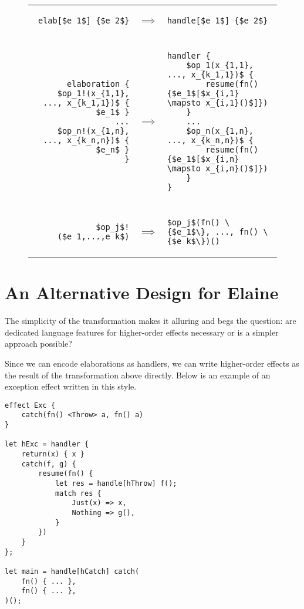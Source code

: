 \begin{figure}[H]
\begin{tabular}{rcl}
\begin{lstlisting}
elab[$e_1$] {$e_2$}
\end{lstlisting}
& $\implies$
& \begin{lstlisting}
handle[$e_1$] {$e_2$}
\end{lstlisting}
\\\\
\begin{lstlisting}
elaboration {
    $op_1!(x_{1,1}, ..., x_{k_1,1})$ { $e_1$ }
    ...
    $op_n!(x_{1,n}, ..., x_{k_n,n})$ { $e_n$ }
}
\end{lstlisting}
&$\implies$
&\begin{lstlisting}
handler {
    $op_1(x_{1,1}, ..., x_{k_1,1})$ {
        resume(fn() {$e_1$[$x_{i,1} \mapsto x_{i,1}()$]})
    }
    ...
    $op_n(x_{1,n}, ..., x_{k_n,n})$ {
        resume(fn() {$e_1$[$x_{i,n} \mapsto x_{i,n}()$]})
    }
}
\end{lstlisting}
\\\\
\begin{lstlisting}
$op_j$!($e_1,...,e_k$)
\end{lstlisting}
& $\implies$
& \begin{lstlisting}
$op_j$(fn() \{$e_1$\}, ..., fn() \{$e_k$\})()
\end{lstlisting}
\end{tabular}
\end{figure}

\section{An Alternative Design for Elaine}

The simplicity of the transformation makes it alluring and begs the question: are dedicated language features for higher-order effects necessary or is a simpler approach possible?

Since we can encode elaborations as handlers, we can write higher-order effects as the result of the transformation above directly. Below is an example of an exception effect written in this style.

\begin{lstlisting}[language=elaine,style=fancy]
effect Exc {
    catch(fn() <Throw> a, fn() a)
}

let hExc = handler {
    return(x) { x }
    catch(f, g) {
        resume(fn() {
            let res = handle[hThrow] f();
            match res {
                Just(x) => x,
                Nothing => g(),
            }
        })
    }
};

let main = handle[hCatch] catch(
    fn() { ... },
    fn() { ... },
)();
\end{lstlisting}

